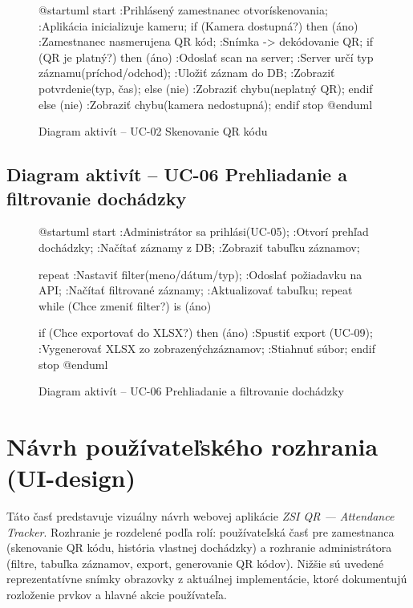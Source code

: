 \begin{figure}[H]
\centering
{}
\begin{plantuml}
@startuml
start
:Prihlásený zamestnanec otvorí skenovania;
:Aplikácia inicializuje kameru;
if (Kamera dostupná?) then (áno)
  :Zamestnanec nasmeruje\nkameru na QR kód;
  :Snímka -> dekódovanie QR;
  if (QR je platný?) then (áno)
    :Odoslať scan na server;
    :Server určí typ záznamu\n(príchod/odchod);
    :Uložiť záznam do DB;
    :Zobraziť potvrdenie\n(typ, čas);
  else (nie)
    :Zobraziť chybu\n(neplatný QR);
  endif
else (nie)
  :Zobraziť chybu\n(kamera nedostupná);
endif
stop
@enduml
\end{plantuml}
\caption{Diagram aktivít – UC-02 Skenovanie QR kódu}\label{o:act-uc02-scan}
\end{figure}

\subsection{Diagram aktivít – UC-06 Prehliadanie a filtrovanie dochádzky}

\begin{figure}[H]
\centering
{}
\begin{plantuml}
@startuml
start
:Administrátor sa prihlási\n(UC-05);
:Otvorí prehľad dochádzky;
:Načítať záznamy z DB;
:Zobraziť tabuľku záznamov;

repeat
  :Nastaviť filter\n(meno/dátum/typ);
  :Odoslať požiadavku na API;
  :Načítať filtrované záznamy;
  :Aktualizovať tabuľku;
repeat while (Chce zmeniť filter?) is (áno)

if (Chce exportovať do XLSX?) then (áno)
  :Spustiť export (UC-09);
  :Vygenerovať XLSX zo zobrazených záznamov;
  :Stiahnuť súbor;
endif
stop
@enduml
\end{plantuml}
\caption{Diagram aktivít – UC-06 Prehliadanie a filtrovanie dochádzky}\label{o:act-uc06-view-filter}
\end{figure}

\section{Návrh používateľského rozhrania (UI-design)}

Táto časť predstavuje vizuálny návrh webovej aplikácie \textit{ZSI QR — Attendance Tracker}.
Rozhranie je rozdelené podľa rolí: používateľská časť pre zamestnanca (skenovanie QR kódu, história vlastnej dochádzky)
a rozhranie administrátora (filtre, tabuľka záznamov, export, generovanie QR kódov). Nižšie sú uvedené reprezentatívne
snímky obrazovky z aktuálnej implementácie, ktoré dokumentujú rozloženie prvkov a hlavné akcie používateľa.


